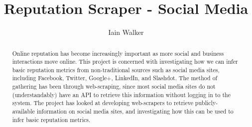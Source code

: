 \documentclass[11pt
              , a4paper
              , twoside
              , openright
              ]{report}
\title{Reputation Scraper - Social Media}
\author{Iain Walker}
\date{}
\begin{document}
\frontmatter



\begin{abstract}

Online reputation has become increasingly important as more social and business interactions move online. This project is concerned with investigating how we can infer basic reputation metrics from non-traditional sources such as social media sites, including Facebook, Twitter, Google+, LinkedIn, and Slashdot. The method of gathering has been through web-scraping, since most social media sites do not (understandably) have an API to retrieve this information without logging in to the system. The project has looked at developing web-scrapers to retrieve publicly-available information on social media sites, and investigating how this can be used to infer basic reputation metrics. 

\end{abstract}


\maketitle


\tableofcontents



\mainmatter










%


%



\backmatter



%
\nocite{*}


\end{document}
